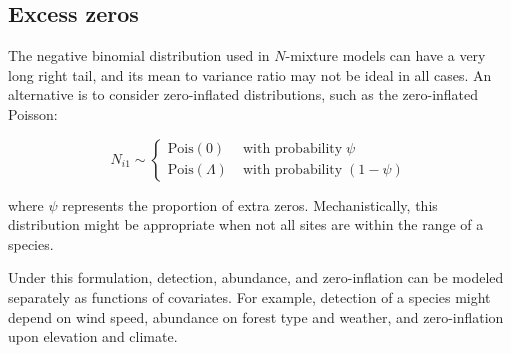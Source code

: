 \documentclass[12pt,english]{article}
\begin{document}
\begin{spacing}{1.9}
\begin{flushleft}


\subsection*{Excess zeros}

The negative binomial distribution used in $N$-mixture models can have
a very long right tail, and its mean to variance ratio may not be
ideal in all cases. An alternative is to consider zero-inflated
distributions, such as the zero-inflated Poisson:
\begin{linenomath*}
\begin{equation}
N_{i1} \sim \left\{
\begin{aligned}
\mbox{Pois}(0) &\; \text{with probability} \; \psi \\
\mbox{Pois}(\Lambda) &\; \text{with probability} \; (1-\psi)
\end{aligned} \right.
\label{eq:ZIP}
\end{equation}
\end{linenomath*}
where $\psi$ represents the proportion of extra zeros. 
Mechanistically, this distribution might be appropriate when not all sites are 
within the range of a species.

Under this formulation, 
detection, abundance, and zero-inflation can be modeled separately as
functions of covariates. For example, detection of a
species might depend on wind speed,
abundance on forest type and weather, and zero-inflation upon elevation and
climate.  


\end{flushleft}
\end{spacing}
\end{document}
